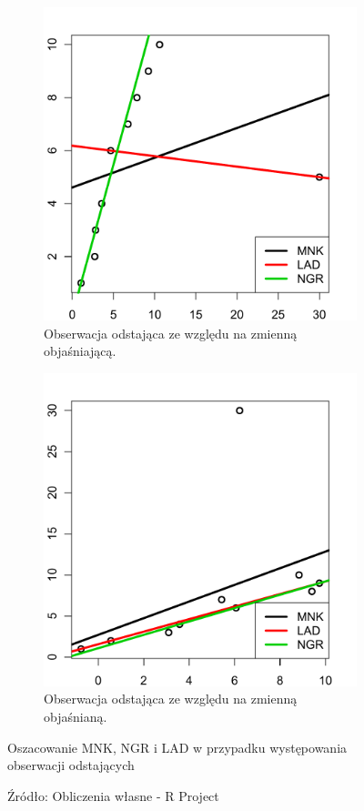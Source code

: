 \documentclass[man,mfu]{mgrwms}
\begin{document}
\begin{figure}[H]

\begin{subfigure}[t]{0.45\textwidth}
  \includegraphics[width=\linewidth]{ladout}
	\caption{Obserwacja odstająca ze względu na zmienną objaśniającą.}
	\label{lad1}  
  
\end{subfigure}
\begin{subfigure}[t]{0.45\textwidth}
  \includegraphics[width=\linewidth]{ladouty}
  \caption{Obserwacja odstająca ze względu na zmienną objaśnianą.}
  \label{lad2}
\end{subfigure}
\caption{Oszacowanie MNK, NGR i LAD w przypadku występowania obserwacji odstających}
\caption*{Źródło: Obliczenia własne - R Project}
\label{fig:lad}
\end{figure}
\end{document}
